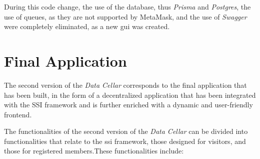 During this code change, the use of the database, thus \textit{Prisma} and \textit{Postgres}, the use of queues, as they are not supported by MetaMask, and the use of \textit{Swagger} were completely 
eliminated, as a new \gls{gui} was created.

\section{Final Application}

The second version of the \textit{Data Cellar} corresponds to the final application that has been built, in the form of a decentralized application that has been integrated with the 
SSI framework and is further enriched with a dynamic and user-friendly frontend.

The functionalities of the second version of the \textit{Data Cellar} can be divided into functionalities that relate to the \gls{ssi} framework, those designed for visitors, and those 
for registered members.These functionalities include:

